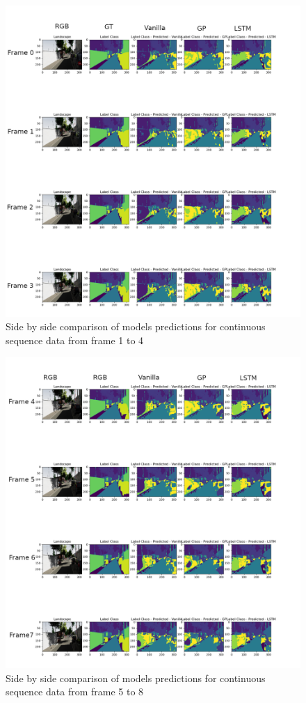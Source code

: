 	\begin{figure}
		\centering
		\includegraphics[width=19cm]{images/continuous_sequence_data1.png}
		\caption{Side by side comparison of models predictions for continuous sequence data from frame 1 to 4}
		\label{fig:performance_metric_three_classes}
	\end{figure}

	\begin{figure}
		\centering
		\includegraphics[width=19cm]{images/continuous_sequence_data2.png}
		\caption{Side by side comparison of models predictions for continuous sequence data from frame 5 to 8}
		\label{fig:performance_metric_three_classes}
	\end{figure}

